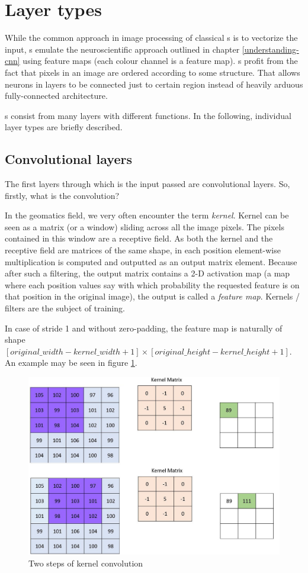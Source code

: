\section{Layer types}
\label{layers}

While the common approach in image processing of classical s is to 
vectorize the input, s emulate the neuroscientific approach outlined in 
chapter \ref{understanding-cnn} using feature maps (each colour channel is a 
feature map). s profit from the fact that pixels in an image are ordered 
according to some structure. That allows neurons in layers to be connected just 
to certain region instead of heavily arduous fully-connected architecture. 

s consist from many layers with different functions. In the following, 
individual layer types are briefly described. 

\subsection{Convolutional layers}
\label{conv-layers}

The first layers through which is the input passed are convolutional layers. So, 
firstly, what is the convolution? 

In the geomatics field, we very often encounter the term \textit{kernel}. Kernel 
can be seen as a matrix (or a window) sliding across all the image pixels. The 
pixels contained in this window are a receptive field. As both the kernel and 
the receptive field are matrices of the same shape, in each position element-wise
multiplication is computed and outputted as an output matrix element. 
Because after such a filtering, the output matrix contains a 2-D activation map 
(a map where each position values say with which probability the requested 
feature is on that position in the original image), the output is called a 
\textit{feature map}. Kernels / filters are the subject of training. 

In case of stride 1 and without zero-padding, the feature map is naturally of 
shape $[original\_width - kernel\_width + 1] \times [original\_height - 
kernel\_height + 1]$. An example may be seen in figure \ref{fig:conv}. 

\begin{figure}[H]
   \centering
	\includegraphics[width=.4\linewidth]{./pictures/conv.jpg}
	\caption[Kernel convolution]{Two steps of kernel convolution}
      \label{fig:conv}
\end{figure}

